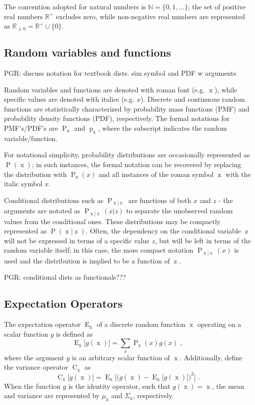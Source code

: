\documentclass[12pt]{report}
\DeclareMathOperator{\xrm}{\mathrm{x}}
\DeclareMathOperator{\zrm}{\mathrm{z}}
\DeclareMathOperator{\Prm}{\mathrm{P}}
\DeclareMathOperator{\prm}{\mathrm{p}}
\DeclareMathOperator{\Erm}{\mathrm{E}}
\DeclareMathOperator{\Crm}{\mathrm{C}}
\begin{document}
The convention adopted for natural numbers is $\mathbb{N} = \{0,1,\ldots\}$; the set of positive real numbers $\mathbb{R}^+$ excludes zero, while non-negative real numbers are represented as $\mathbb{R}_{\geq 0} = \mathbb{R}^+ \cup \{0\}$.


\subsection{Random variables and functions}

PGR: discuss notation for textbook dists. sim symbol and PDF w arguments

Random variables and functions are denoted with roman font (e.g. $\xrm$), while specific values are denoted with italics (e.g. $x$). Discrete and continuous random functions are statistically characterized by probability mass functions (PMF) and probability density functions (PDF), respectively. The formal notations for PMF's/PDF's are $\Prm_{\xrm}$ and $\prm_{\xrm}$, where the subscript indicates the random variable/function. 

For notational simplicity, probability distributions are occasionally represented as $\Prm(\xrm)$; in such instances, the formal notation can be recovered by replacing the distribution with $\Prm_{\xrm}(x)$ and all instances of the roman symbol $\xrm$ with the italic symbol $x$. 

Conditional distributions such as $\Prm_{\xrm | \zrm}$ are functions of both $x$ and $z$ - the arguments are notated as $\Prm_{\xrm | \zrm}(x|z)$ to separate the unobserved random values from the conditional ones. These distributions may be compactly represented as $\Prm(\xrm|\zrm)$. Often, the dependency on the conditional variable $\zrm$ will not be expressed in terms of a specific value $z$, but will be left in terms of the random variable itself; in this case, the more compact notation $\Prm_{\xrm | \zrm}(x)$ is used and the distribution is implied to be a function of $\zrm$.

PGR: conditional dists as functionals???


\subsection{Expectation Operators}

The expectation operator $\Erm_{\xrm}$ of a discrete random function $\xrm$ operating on a scalar function $g$ is defined as
\begin{equation}
\Erm_{\xrm}\big[ g(\xrm) \big] = \sum_{x} \Prm_{\xrm}(x) g(x) \;,
\end{equation}
where the argument $g$ is an arbitrary scalar function of $\xrm$. Additionally, define the variance operator $\Crm_{\xrm}$ as
\begin{equation}
\Crm_{\xrm}\big[g(\xrm)\big] = \Erm_{\xrm} \bigg[ \Big( g(\xrm) - \Erm_{\xrm}\big[g(\xrm)\big] \Big)^2 \bigg] \;.
\end{equation}
When the function $g$ is the identity operator, such that $g(\xrm) = \xrm$, the mean and variance are represented by $\mu_{\xrm}$ and $\Sigma_{\xrm}$, respectively.
\end{document}
